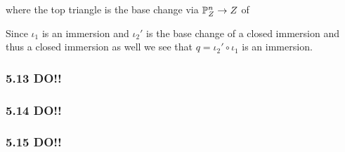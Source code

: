 \documentclass[12pt]{article}
\begin{document}
\begin{enumerate}
\begin{center}
\end{center}
where the top triangle is the base change via $\P^n_Z \to Z$ of
\begin{center}
\end{center}
Since $\iota_1$ is an immersion and $\iota_2'$ is the base change of a closed immersion and thus a closed immersion as well we see that $q = \iota_2' \circ \iota_1$ is an immersion.

\end{enumerate}

\subsubsection{5.13 DO!!}

\subsubsection{5.14 DO!!}

\subsubsection{5.15 DO!!}
\end{document}
